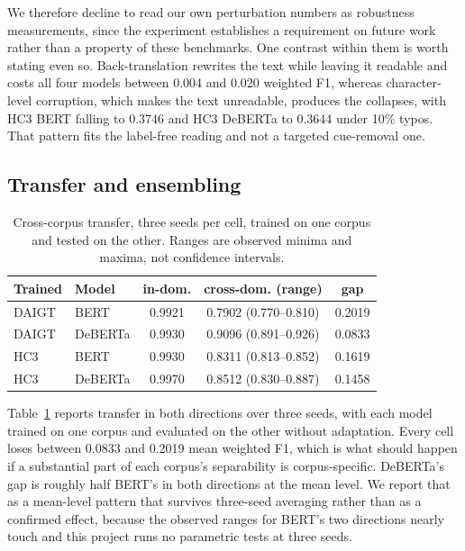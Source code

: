 We therefore decline to read our own perturbation numbers as robustness measurements, since the experiment establishes a requirement on future work rather than a property of these benchmarks. One contrast within them is worth stating even so. Back-translation rewrites the text while leaving it readable and costs all four models between 0.004 and 0.020 weighted F1, whereas character-level corruption, which makes the text unreadable, produces the collapses, with HC3 BERT falling to 0.3746 and HC3 DeBERTa to 0.3644 under 10\% typos. That pattern fits the label-free reading and not a targeted cue-removal one.

\subsection{Transfer and ensembling}

\begin{table}[!ht]
\centering
\caption{Cross-corpus transfer, three seeds per cell, trained on one corpus and tested on the other. Ranges are observed minima and maxima, not confidence intervals.}
\label{tab:cross}
\footnotesize
\setlength{\tabcolsep}{3.5pt}
\begin{tabular}{@{}llccc@{}}
\toprule
Trained & Model & in-dom. & cross-dom. (range) & gap \\
\midrule
DAIGT & BERT & 0.9921 & 0.7902 (0.770--0.810) & 0.2019 \\
DAIGT & DeBERTa & 0.9930 & 0.9096 (0.891--0.926) & 0.0833 \\
HC3 & BERT & 0.9930 & 0.8311 (0.813--0.852) & 0.1619 \\
HC3 & DeBERTa & 0.9970 & 0.8512 (0.830--0.887) & 0.1458 \\
\bottomrule
\end{tabular}
\end{table}

Table~\ref{tab:cross} reports transfer in both directions over three seeds, with each model trained on one corpus and evaluated on the other without adaptation. Every cell loses between 0.0833 and 0.2019 mean weighted F1, which is what should happen if a substantial part of each corpus's separability is corpus-specific. DeBERTa's gap is roughly half BERT's in both directions at the mean level. We report that as a mean-level pattern that survives three-seed averaging rather than as a confirmed effect, because the observed ranges for BERT's two directions nearly touch and this project runs no parametric tests at three seeds.

